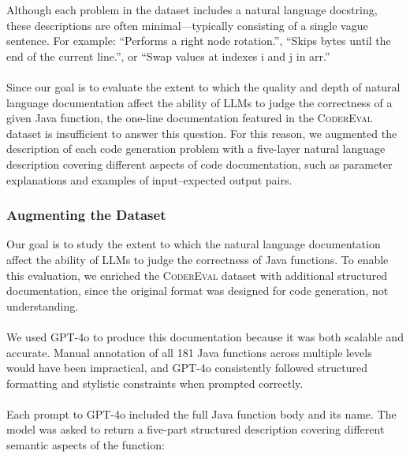 \documentclass[a4paper]{usiinfbachelorproject}
\begin{document}
Although each problem in the dataset includes a natural language docstring, these descriptions are often minimal—typically consisting of a single vague sentence. For example: “Performs a right node rotation.”, “Skips bytes until the end of the current line.”, or “Swap values at indexes i and j in arr.”\\
\\[2pt]
Since our goal is to evaluate the extent to which the quality and depth of natural language documentation affect the ability of LLMs to judge the correctness of a given Java function, the one-line documentation featured in the \textsc{CoderEval} dataset is insufficient to answer this question. For this reason, we augmented the description of each code generation problem with a five-layer natural language description covering different aspects of code documentation, such as parameter explanations and examples of input–expected output pairs.

\subsubsection{Augmenting the Dataset}\label{sec:augmentation}
Our goal is to study the extent to which the natural language documentation affect the ability of LLMs to judge the correctness of Java functions. To enable this evaluation, we enriched the \textsc{CoderEval} dataset with additional structured documentation, since the original format was designed for code generation, not understanding.\\
\\[2pt]
We used GPT-4o to produce this documentation because it was both scalable and accurate. Manual annotation of all 181 Java functions across multiple levels would have been impractical, and GPT-4o consistently followed structured formatting and stylistic constraints when prompted correctly.\\
\\[2pt]
Each prompt to GPT-4o included the full Java function body and its name. The model was asked to return a five-part structured description covering different semantic aspects of the function:
\end{document}

